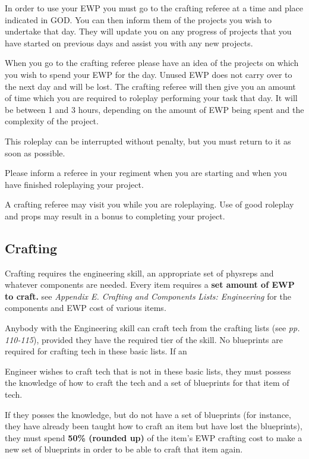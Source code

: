 \documentclass{scrbook}
\begin{document}
In order to use your EWP you must go to the crafting referee at a time and place indicated in GOD. You can then inform them of the projects you wish to undertake that day. They will update you on any progress of projects that you have started on previous days and assist you with any new projects.

When you go to the crafting referee please have an idea of the projects on which you wish to spend your EWP for the day. Unused EWP does not carry over to the next day and will be lost. The crafting referee will then give you an amount of time which you are required to roleplay performing your task that day. It will be between 1 and 3 hours, depending on the amount of EWP being spent and the complexity of the project.

This roleplay can be interrupted without penalty, but you must return to it as soon as possible.

Please inform a referee in your regiment when you are starting and when you have finished roleplaying your project.

A crafting referee may visit you while you are roleplaying. Use of good roleplay and props may result in a bonus to completing your project.

\subsection{Crafting}

Crafting requires the engineering skill, an appropriate set of physreps and whatever components are needed. Every item requires a \textbf{set amount of EWP to craft.} see \textit{Appendix E. Crafting and Components} \textit{Lists: Engineering} for the components and EWP cost of various items.

Anybody with the Engineering skill can craft tech from the crafting lists (see \textit{pp. 110-115}), provided they have the required tier of the skill. No blueprints are required for crafting tech in these basic lists. If an

Engineer wishes to craft tech that is not in these basic lists, they must possess the knowledge of how to craft the tech and a set of blueprints for that item of tech.

If they posses the knowledge, but do not have a set of blueprints (for instance, they have already been taught how to craft an item but have lost the blueprints), they must spend \textbf{50\% (rounded up)} of the item's EWP crafting cost to make a new set of blueprints in order to be able to craft that item again.
\end{document}
